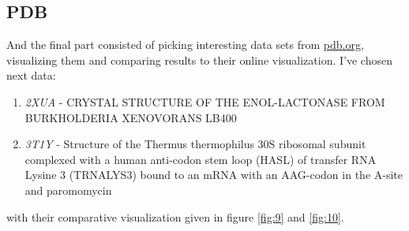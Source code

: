 \documentclass{article}
\begin{document}
\subsection{PDB}
And the final part consisted of picking interesting data sets from \url{pdb.org}, visualizing them and comparing results to their online visualization. I've chosen next data:
\begin{enumerate}
	\item \textit{2XUA} - CRYSTAL STRUCTURE OF THE ENOL-LACTONASE FROM BURKHOLDERIA XENOVORANS LB400
	\item \textit{3T1Y} - Structure of the Thermus thermophilus 30S ribosomal subunit complexed with a human anti-codon stem loop (HASL) of transfer RNA Lysine 3 (TRNALYS3) bound to an mRNA with an AAG-codon in the A-site and paromomycin
\end{enumerate}
with their comparative visualization given in figure \ref{fig:9} and \ref{fig:10}.
\end{document}
